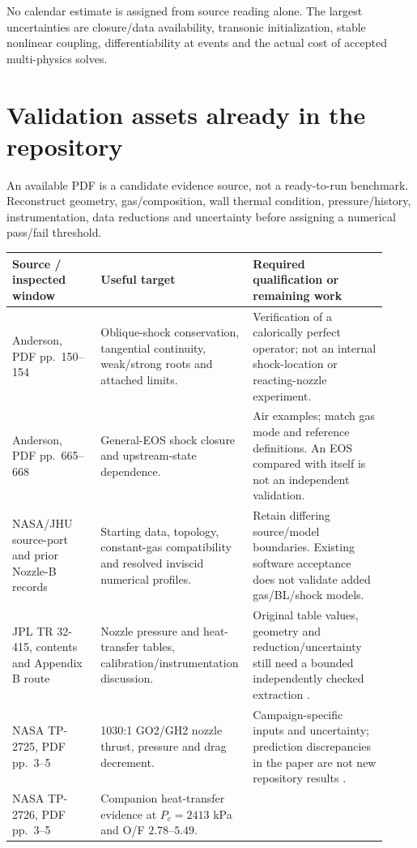 No calendar estimate is assigned from source reading alone. The largest
uncertainties are closure/data availability, transonic initialization,
stable nonlinear coupling, differentiability at events and the actual
cost of accepted multi-physics solves.

\section{Validation assets already in the repository}
\label{sec:validation}
An available PDF is a candidate evidence source, not a ready-to-run
benchmark. Reconstruct geometry, gas/composition, wall thermal condition,
pressure/history, instrumentation, data reductions and uncertainty before
assigning a numerical pass/fail threshold.

\begin{longtable}{@{}P{0.23\linewidth}P{0.34\linewidth}P{0.35\linewidth}@{}}
\toprule\textbf{Source / inspected window} & \textbf{Useful target} &
\textbf{Required qualification or remaining work}\\\midrule
\endhead
Anderson, PDF pp.~150--154 &
Oblique-shock conservation, tangential continuity, weak/strong roots and
attached limits. &
Verification of a calorically perfect operator; not an internal
shock-location or reacting-nozzle experiment.\\
Anderson, PDF pp.~665--668 &
General-EOS shock closure and upstream-state dependence. &
Air examples; match gas mode and reference definitions. An EOS compared
with itself is not an independent validation.\\
NASA/JHU source-port and prior Nozzle-B records &
Starting data, topology, constant-gas compatibility and resolved
inviscid numerical profiles. &
Retain differing source/model boundaries. Existing software acceptance
does not validate added gas/BL/shock models.\\
JPL TR 32-415, contents and Appendix B route &
Nozzle pressure and heat-transfer tables, calibration/instrumentation
discussion. &
Original table values, geometry and reduction/uncertainty still need a
bounded independently checked extraction \cite{back}.\\
NASA TP-2725, PDF pp.~3--5 &
1030:1 GO2/GH2 nozzle thrust, pressure and drag decrement. &
Campaign-specific inputs and uncertainty; prediction discrepancies in
the paper are not new repository results \cite{tp2725}.\\
NASA TP-2726, PDF pp.~3--5 &
Companion heat-transfer evidence at \(P_c=2413\) kPa and
O/F \(2.78\)--\(5.49\). &

\end{longtable}
